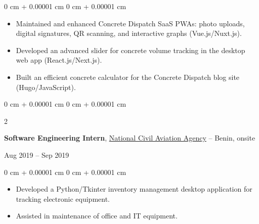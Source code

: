 \documentclass[10pt, letterpaper]{article}
\newenvironment{highlights}{
    \begin{itemize}[
        topsep=0.10 cm,
        parsep=0.10 cm,
        partopsep=0pt,
        itemsep=0pt,
        leftmargin=0 cm + 10pt
    ]
}{
    \end{itemize}
} %
\newenvironment{onecolentry}{
    \begin{adjustwidth}{
        0 cm + 0.00001 cm
    }{
        0 cm + 0.00001 cm
    }
}{
    \end{adjustwidth}
} %
\newenvironment{twocolentry}[2][]{
    \onecolentry
    \def\secondColumn{#2}
    \setcolumnwidth{\fill, 3.5 cm} %
    \begin{paracol}{2}
}{
    \switchcolumn \raggedleft \secondColumn
    \end{paracol}
    \endonecolentry
} %
\let\hrefWithoutArrow\href
\begin{document}
            \vspace{0.10 cm}
            \begin{onecolentry}
                \begin{highlights}
                    
                        \item Maintained and enhanced Concrete Dispatch SaaS PWAs: photo uploads, digital signatures, QR scanning, and interactive graphs (Vue.js/Nuxt.js).
                    
                        \item Developed an advanced slider for concrete volume tracking in the desktop web app (React.js/Next.js).
                    
                        \item Built an efficient concrete calculator for the Concrete Dispatch blog site (Hugo/JavaScript).
                    
                \end{highlights}
            \end{onecolentry}
            \vspace{0.2 cm}
        
            \begin{twocolentry}{
                Aug 2019 -- Sep 2019
            }
                \textbf{Software Engineering Intern}, \hrefWithoutArrow{https://anac.bj/}{National Civil Aviation Agency} -- Benin, onsite
            \end{twocolentry}

            \vspace{0.10 cm}
            \begin{onecolentry}
                \begin{highlights}
                    
                        \item Developed a Python/Tkinter inventory management desktop application for tracking electronic equipment.
                    
                        \item Assisted in maintenance of office and IT equipment.
                    
                \end{highlights}
            \end{onecolentry}
            \vspace{0.2 cm}
        
\end{document}
